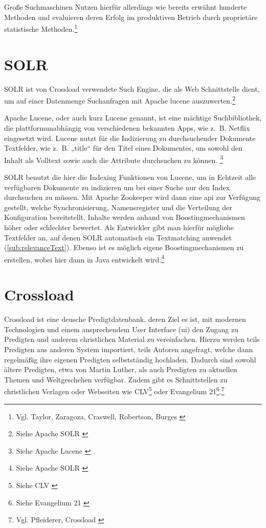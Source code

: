 Große Suchmaschinen Nutzen hierfür allerdings wie bereits erwähnt hunderte Methoden und evaluieren deren Erfolg im produktiven Betrieb durch proprietäre statistische Methoden.\footnote{Vgl. Taylor, Zaragoza, Craswell, Robertson, Burges \cite{taylor2006}}

\section{SOLR}
\label{sec:SOLR}
SOLR ist von Crossload verwendete Such Engine, die als Web Schnittstelle dient, um auf einer Datenmenge Suchanfragen mit Apache \gls{lucene} auszuwerten.\footnote{Siehe Apache SOLR \cite{solr2022}}

Apache Lucene, oder auch kurz Lucene genannt, ist eine mächtige Suchbibliothek, die plattformunabhängig von verschiedenen bekannten Apps, wie z. B. Netflix eingesetzt wird.
Lucene nutzt für die Indizierung zu durchsuchender Dokumente Textfelder, wie z. B. „title“ für den Titel eines Dokumentes, um sowohl den Inhalt als Volltext sowie auch die Attribute durchsuchen zu können. \footnote{Siehe Apache Lucene \cite{lucene2022}}

SOLR benutzt die hier die Indexing Funktionen von Lucene, um in Echtzeit alle verfügbaren Dokumente zu indizieren um bei einer Suche nur den Index durchsuchen zu müssen.
Mit Apache Zookeeper wird dann eine \gls{api} zur Verfügung gestellt, welche Synchronisierung, Namensregister und die Verteilung der Konfiguration bereitstellt.
Inhalte werden anhand von Boostingmechanismen höher oder schlechter bewertet.
Als Entwickler gibt man hierfür mögliche Textfelder an, auf denen SOLR automatisch ein Textmatching anwendet (\ref{sub:relevanceText}).
Ebenso ist es möglich eigene Boostingmechanismen zu erstellen, wobei hier dann in Java entwickelt wird.\footnote{Siehe Apache SOLR \cite{solr2022}}

\section{Crossload}
\label{sec:crossload}
Crossload ist eine deusche Predigtdatenbank, deren Ziel es ist, mit modernen Technologien und einem ansprechendem User Interface (\gls{ui}) den Zugang zu Predigten und anderem christlichen Material zu vereinfachen.
Hierzu werden teils Predigten aus anderen System importiert, teils Autoren angefragt, welche dann regelmäßig ihre eigenen Predigten selbstständig hochladen.
Dadurch sind sowohl ältere Predigten, etwa von Martin Luther, als auch Predigten zu aktuellen Themen und Weltgeschehen verfügbar.
Zudem gibt es Schnittstellen zu christlichen Verlagen oder Webseiten wie CLV\footnote{Siehe CLV \cite{clv2022}} oder Evangelium 21\footnote{Siehe Evangelium 21 \cite{evangelium21e.v.22}}.\footnote{Vgl. Pfleiderer, Crossload \cite{pfleiderer2022}}

